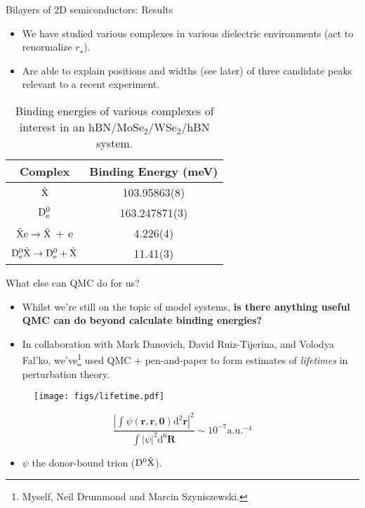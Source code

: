 \documentclass[12pt, pdf, hyperref={draft}, usenames, dvipsnames]{beamer}
\newcommand{\dd}{\mathrm{d}}
\begin{document}
\begin{frame}{Bilayers of 2D semiconductors: Results}
\begin{itemize}
  \item We have studied various complexes in various dielectric environments
  (act to renormalize $r_\star$).
  \item Are able to explain positions and widths (see later) of three candidate
  peaks relevant to a recent experiment.
\end{itemize}


\begin{table}[H]
  \centering
  \begin{tabular}{c|c}
  Complex & Binding Energy (meV) \\ \hline
  $\tilde{\rm X}$ & 103.95863(8) \\
  ${\rm D}^0_{\rm e}$ & 163.247871(3)\\
  $\tilde{\rm X}{\rm e} \rightarrow \tilde{\rm X}$ + {\rm e} & 4.226(4) \\
  ${\rm D}^0_{\rm e} \tilde{\rm X}\rightarrow {\rm D}^{0}_{\rm e} + \tilde{\rm X}$ & 11.41(3)
  \end{tabular}
  \caption{Binding energies of various complexes of interest in an
  hBN/MoSe$_2$/WSe$_2$/hBN system.}\label{tab:hbn_hbn_4.0_results}
\end{table}
\end{frame}


\begin{frame}{What else can QMC do for us?}

\begin{itemize} \item Whilst we're still on the topic of model systems, {\bf is
there anything useful QMC can do beyond calculate binding energies?}

  \item In collaboration with Mark Danovich, David Ruiz-Tijerina, and Volodya
  Fal'ko, we've\footnote{Myself, Neil Drummond and Marcin Szyniszewski.} used
  QMC + pen-and-paper to form estimates of {\it lifetimes\/} in perturbation
  theory.
  \end{itemize}

\begin{minipage}[t]{0.49\textwidth}
  \begin{figure}[H]
    \centering
    \texttt{[image: figs/lifetime.pdf]}\label{fig:lifetime}
  \end{figure}
\end{minipage}%
\hfill
\begin{minipage}[t]{0.49\textwidth}
\vspace*{-.5cm}
\begin{equation}
    \frac{\left| \int \psi (\mathbf{r}, \mathbf{r}, \mathbf{0})
    \dd^2 \mathbf{r} \right|^2}{\int | \psi |^2 \dd^6 \mathbf{R}} \sim 10^{-7}
    \text{a.u.}^{-4} \nonumber
\end{equation}
\begin{itemize}
  \item $\psi$ the donor-bound trion (${\rm D}^0\tilde{\rm X}$).
\end{itemize}
\end{minipage}%
\end{frame}
\end{document}
